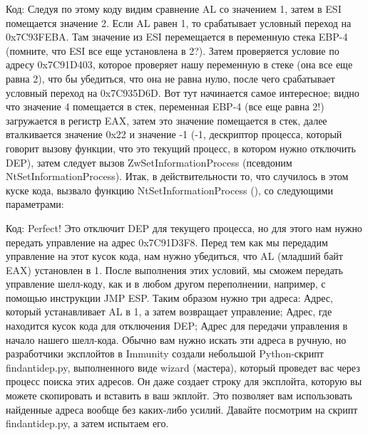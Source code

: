 \documentclass[12pt, a4paper, oneside]{book}
\begin{document}
Код:
Следуя по этому коду видим сравнение AL со значением 1, затем в ESI помещается значение 2. Если AL равен 1, то срабатывает условный переход на 0x7C93FEBA. Там значение из ESI перемещается в переменную стека EBP-4 (помните, что ESI все еще установлена в 2?). Затем проверяется условие по адресу 0x7C91D403, которое проверяет нашу переменную в стеке (она все еще равна 2), что бы убедиться, что она не равна нулю, после чего срабатывает условный переход на 0x7C935D6D. Вот тут начинается самое интересное; видно что значение 4 помещается в стек, переменная EBP-4 (все еще равна 2!) загружается в регистр EAX, затем это значение помещается в стек, далее вталкивается значение 0x22 и значение -1 (-1, дескриптор процесса, который говорит вызову функции, что это текущий процесс, в котором нужно отключить DEP), затем следует вызов ZwSetInformationProcess (псевдоним NtSetInformationProcess). Итак, в действительности то, что случилось в этом куске кода, вызвало функцию NtSetInformationProcess (), со следующими параметрами:

Код:
Perfect! Это отключит DEP для текущего процесса, но для этого нам нужно передать управление на адрес 0x7C91D3F8. Перед тем как мы передадим управление на этот кусок кода, нам нужно убедиться, что AL (младший байт EAX) установлен в 1. После выполнения этих условий, мы сможем передать управление шелл-коду, как и в любом другом переполнении, например, с помощью инструкции JMP ESP. Таким образом нужно три адреса:
Адрес, который устанавливает AL в 1, а затем возвращает управление;
Адрес, где находится кусок кода для отключения DEP;
Адрес для передачи управления в начало нашего шелл-кода.
Обычно вам нужно искать эти адреса в ручную, но разработчики эксплойтов в Immunity создали небольшой Python-скрипт findantidep.py, выполненного виде wizard (мастера), который проведет вас через процесс поиска этих адресов. Он даже создает строку для эксплойта, которую вы можете скопировать и вставить в ваш экплойт. Это позволяет вам использовать найденные адреса вообще без каких-либо усилий. Давайте посмотрим на скрипт findantidep.py, а затем испытаем его.
\end{document}
